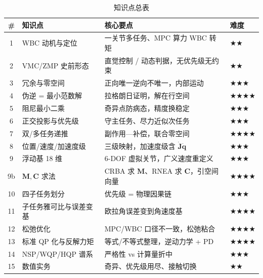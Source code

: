 \begin{table}[H]\centering\small
\caption{知识点总表}
\begin{tabular}{clll}
\toprule
\# & 知识点 & 核心要点 & 难度 \\
\midrule
1 & WBC 动机与定位 & 一关节多任务、MPC 算力 WBC 转矩 & \(\bigstar\bigstar\) \\
2 & VMC/ZMP 史前形态 & 直觉控制 / 动态判据，无优先级无约束 & \(\bigstar\bigstar\) \\
3 & 冗余与零空间 & 正向唯一逆向不唯一，内部运动 & \(\bigstar\bigstar\bigstar\) \\
4 & 伪逆 = 最小范数解 & 拉格朗日证明，解在行空间 & \(\bigstar\bigstar\bigstar\bigstar\) \\
5 & 阻尼最小二乘 & 奇异点防病态，精度换稳定 & \(\bigstar\bigstar\bigstar\) \\
6 & 正交投影与优先级 & 守主任务、尽力近似次任务 & \(\bigstar\bigstar\bigstar\) \\
7 & 双/多任务递推 & 副作用—补偿，联合零空间 & \(\bigstar\bigstar\bigstar\bigstar\) \\
8 & 位置/速度/加速度级 & 三级映射，加速度级含 $\dot{\boldsymbol{J}}\dot{\boldsymbol{q}}$ & \(\bigstar\bigstar\bigstar\) \\
9 & 浮动基 18 维 & 6-DOF 虚拟关节，广义速度重定义 & \(\bigstar\bigstar\bigstar\) \\
9b & $\boldsymbol{M},\boldsymbol{C}$ 求法 & CRBA 求 $\boldsymbol{M}$、RNEA 求 $\boldsymbol{C}$，引空间向量 & \(\bigstar\bigstar\bigstar\bigstar\) \\
10 & 四子任务划分 & 优先级 = 物理因果链 & \(\bigstar\bigstar\bigstar\) \\
11 & 子任务雅可比与误差变基 & 欧拉角误差变到角速度基 & \(\bigstar\bigstar\bigstar\bigstar\) \\
12 & 松弛优化 & MPC/WBC 口径不一致，松弛粘合 & \(\bigstar\bigstar\bigstar\bigstar\) \\
13 & 标准 QP 化与反解力矩 & 等式/不等式整理，逆动力学 + PD & \(\bigstar\bigstar\bigstar\bigstar\) \\
14 & NSP/WQP/HQP 谱系 & 严格性 vs 计算量折中 & \(\bigstar\bigstar\bigstar\) \\
15 & 数值实务 & 奇异、优先级用尽、接触切换 & \(\bigstar\bigstar\) \\
\bottomrule
\end{tabular}
\end{table}

